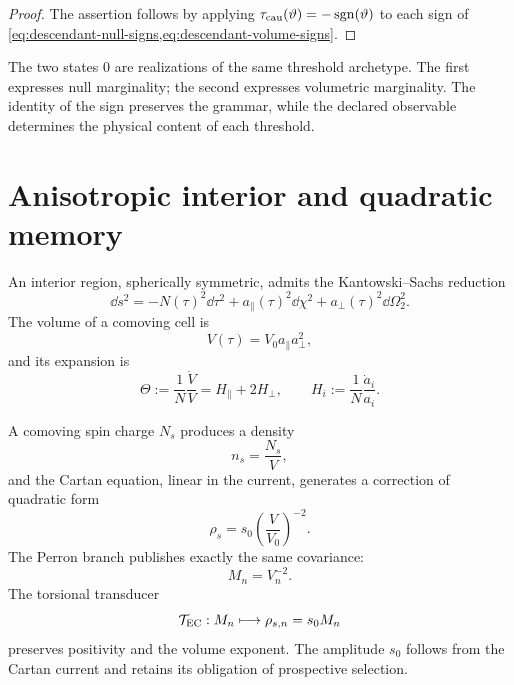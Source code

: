 \begin{proof}
The assertion follows by applying
\(\tau_{\rm cau}(\vartheta)=-\operatorname{sgn}(\vartheta)\) to each sign of
\cref{eq:descendant-null-signs,eq:descendant-volume-signs}.
\end{proof}

The two states \(0\) are realizations of the same threshold archetype. The
first expresses null marginality; the second expresses volumetric marginality.
The identity of the sign preserves the grammar, while the
declared observable determines the physical content of each threshold.

\section{Anisotropic interior and quadratic memory}

An interior region, spherically symmetric, admits the Kantowski--Sachs
reduction
\begin{equation}
 \dd s^2=-N(\tau)^2\dd\tau^2
 +a_\parallel(\tau)^2\dd\chi^2
 +a_\perp(\tau)^2\dd\Omega_2^2.
 \label{eq:descendant-KS-metric}
\end{equation}
The volume of a comoving cell is
\begin{equation}
 V(\tau)=V_0a_\parallel a_\perp^2,
 \label{eq:descendant-KS-volume}
\end{equation}
and its expansion is
\begin{equation}
 \Theta
 :=\frac1N\frac{\dot V}{V}
 =H_\parallel+2H_\perp,
 \qquad
 H_i:=\frac1N\frac{\dot a_i}{a_i}.
 \label{eq:descendant-KS-expansion}
\end{equation}

A comoving spin charge \(N_s\) produces a density
\begin{equation}
 n_s=\frac{N_s}{V},
 \label{eq:descendant-spin-number-density}
\end{equation}
and the Cartan equation, linear in the current, generates a correction of quadratic form
\begin{equation}
 \rho_s=s_0\left(\frac V{V_0}\right)^{-2}.
 \label{eq:descendant-spin-density}
\end{equation}
The Perron branch publishes exactly the same covariance:
\begin{equation}
 M_n=V_n^{-2}.
 \label{eq:descendant-Perron-volume}
\end{equation}
The torsional transducer
\begin{equation}
 \mathcal T_{\rm EC}:M_n\longmapsto
 \rho_{s,n}=s_0M_n
 \label{eq:descendant-EC-transducer}
\end{equation}
preserves positivity and the volume exponent. The amplitude \(s_0\) follows
from the Cartan current and retains its obligation of prospective selection.


